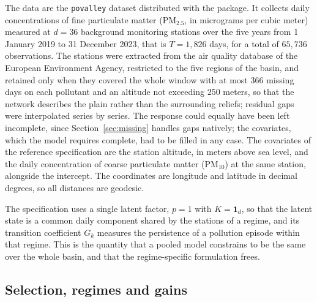 The data are the \texttt{povalley} dataset distributed with the package. It collects daily concentrations of fine particulate matter (PM$_{2.5}$, in micrograms per cubic meter) measured at $d = 36$ background monitoring stations over the five years from 1 January 2019 to 31 December 2023, that is $T = 1{,}826$ days, for a total of $65{,}736$ observations. The stations were extracted from the air quality database of the European Environment Agency, restricted to the five regions of the basin, and retained only when they covered the whole window with at most $366$ missing days on each pollutant and an altitude not exceeding $250$ meters, so that the network describes the plain rather than the surrounding reliefs; residual gaps were interpolated series by series. The response could equally have been left incomplete, since Section~\ref{sec:missing} handles gaps natively; the covariates, which the model requires complete, had to be filled in any case. The covariates of the reference specification are the station altitude, in meters above sea level, and the daily concentration of coarse particulate matter (PM$_{10}$) at the same station, alongside the intercept. The coordinates are longitude and latitude in decimal degrees, so all distances are geodesic.

The specification uses a single latent factor, $p = 1$ with $K = \mathbf{1}_d$, so that the latent state is a common daily component shared by the stations of a regime, and its transition coefficient $G_k$ measures the persistence of a pollution episode within that regime. This is the quantity that a pooled model constrains to be the same over the whole basin, and that the regime-specific formulation frees.

\subsection{Selection, regimes and gains}\label{sec4:results}


